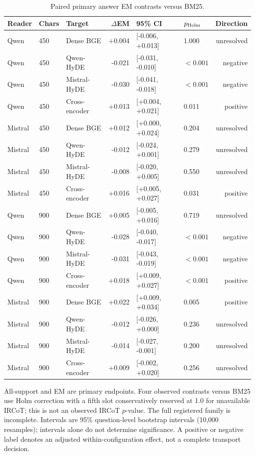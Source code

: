 \begin{table}[!htbp]
\centering\footnotesize
\caption{Paired primary answer EM contrasts versus BM25.}
\label{tab:mhrag_em}
\begin{threeparttable}
\setlength{\tabcolsep}{3pt}
\begin{tabular}{lllrllr}
\toprule
Reader & Chars & Target & $\Delta$EM & 95\% CI & $p_{\rm Holm}$ & Direction \\
\midrule
Qwen & 450 & Dense BGE & +0.004 & [-0.006, +0.013] & 1.000 & unresolved \\
Qwen & 450 & Qwen-HyDE & -0.021 & [-0.031, -0.010] & $<0.001$ & negative \\
Qwen & 450 & Mistral-HyDE & -0.030 & [-0.041, -0.018] & $<0.001$ & negative \\
Qwen & 450 & Cross-encoder & +0.013 & [+0.004, +0.021] & 0.011 & positive \\
Mistral & 450 & Dense BGE & +0.012 & [+0.000, +0.024] & 0.204 & unresolved \\
Mistral & 450 & Qwen-HyDE & -0.012 & [-0.024, +0.001] & 0.279 & unresolved \\
Mistral & 450 & Mistral-HyDE & -0.008 & [-0.020, +0.005] & 0.550 & unresolved \\
Mistral & 450 & Cross-encoder & +0.016 & [+0.005, +0.027] & 0.031 & positive \\
Qwen & 900 & Dense BGE & +0.005 & [-0.005, +0.016] & 0.719 & unresolved \\
Qwen & 900 & Qwen-HyDE & -0.028 & [-0.040, -0.017] & $<0.001$ & negative \\
Qwen & 900 & Mistral-HyDE & -0.031 & [-0.043, -0.019] & $<0.001$ & negative \\
Qwen & 900 & Cross-encoder & +0.018 & [+0.009, +0.027] & $<0.001$ & positive \\
Mistral & 900 & Dense BGE & +0.022 & [+0.009, +0.034] & 0.005 & positive \\
Mistral & 900 & Qwen-HyDE & -0.012 & [-0.026, +0.000] & 0.236 & unresolved \\
Mistral & 900 & Mistral-HyDE & -0.014 & [-0.027, -0.001] & 0.200 & unresolved \\
Mistral & 900 & Cross-encoder & +0.009 & [-0.002, +0.020] & 0.256 & unresolved \\
\bottomrule
\end{tabular}
\begin{tablenotes}\scriptsize\item All-support and EM are primary endpoints. Four observed contrasts versus BM25 use Holm correction with a fifth slot conservatively reserved at 1.0 for unavailable IRCoT; this is not an observed IRCoT $p$-value. The full registered family is incomplete. Intervals are 95\% question-level bootstrap intervals (10,000 resamples); intervals alone do not determine significance. A positive or negative label denotes an adjusted within-configuration effect, not a complete transport decision.
\end{tablenotes}
\end{threeparttable}
\end{table}
